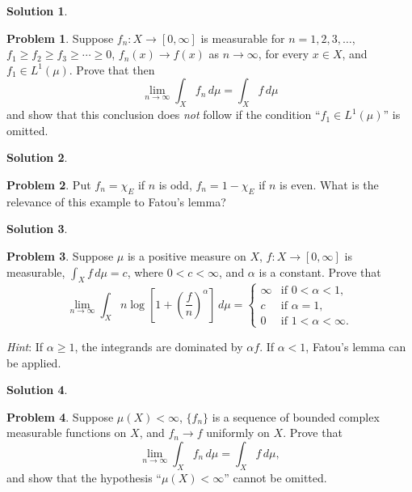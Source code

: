 \documentclass[12pt]{article}
\theoremstyle{definition} %
\newtheorem{solution}{Solution}
\newtheorem{problem}{Problem}
\theoremstyle{plain} %
\begin{document}
\begin{solution}
  
\end{solution}
\begin{problem}
  Suppose $f_n \colon X \to [0, \infty]$ is measurable for $n = 1, 2, 3, \dots$, $f_1 \ge f_2 \ge f_3 \ge \cdots \ge 0$, $f_n(x) \to f(x)$ as $n \to \infty$, for every $x \in X$, and $f_1 \in L^1(\mu)$. Prove that then
  \[
  \lim_{n \to \infty} \int_X f_n\, d\mu = \int_X f\, d\mu
  \]
  and show that this conclusion does \emph{not} follow if the condition ``$f_1 \in L^1(\mu)$'' is omitted.
  \end{problem}
\begin{solution}
  
\end{solution}
\begin{problem}
  Put $f_n = \chi_E$ if $n$ is odd, $f_n = 1 - \chi_E$ if $n$ is even. What is the relevance of this example to Fatou's lemma?
  \end{problem}
\begin{solution}
  
\end{solution}
\begin{problem}
  Suppose $\mu$ is a positive measure on $X$, $f \colon X \to [0, \infty]$ is measurable, $\int_X f\, d\mu = c$, where $0 < c < \infty$, and $\alpha$ is a constant. Prove that
  \[
  \lim_{n \to \infty} \int_X n \log\left[1 + \left(\frac{f}{n}\right)^\alpha\right]\, d\mu =
  \begin{cases}
  \infty & \text{if } 0 < \alpha < 1, \\
  c      & \text{if } \alpha = 1, \\
  0      & \text{if } 1 < \alpha < \infty.
  \end{cases}
  \]
  
  \textit{Hint}: If $\alpha \ge 1$, the integrands are dominated by $\alpha f$. If $\alpha < 1$, Fatou’s lemma can be applied.
  \end{problem}
\begin{solution}
  
\end{solution}
\begin{problem}
  Suppose $\mu(X) < \infty$, $\{f_n\}$ is a sequence of bounded complex measurable functions on $X$, and $f_n \to f$ uniformly on $X$. Prove that
  \[
  \lim_{n \to \infty} \int_X f_n\, d\mu = \int_X f\, d\mu,
  \]
  and show that the hypothesis “$\mu(X) < \infty$” cannot be omitted.
  \end{problem}
\end{document}
